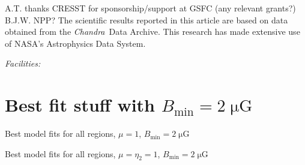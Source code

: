 \documentclass[iop, apj, numberedappendix]{emulateapj}
\newcommand*{\mt}{\mathrm}
\newcommand*{\unit}[1]{\;\mt{#1}}  %
\newcommand*{\Chandra}{\textit{Chandra}\ }
\newcommand*{\mE}{m_\mt{E}}
\newcommand*{\Bmin}{B_{\mt{min}}}
\newcommand*{\muG}{\unit{\mu G}}
\begin{document}
\acknowledgments

A.T. thanks CRESST for sponsorship/support at GSFC (any relevant grants?)
B.J.W. NPP?
The scientific results reported in this article are based on data obtained from
the \Chandra Data Archive.
This research has made extensive use of NASA's Astrophysics Data System.

{\it Facilities:} 

\clearpage
\appendix

\setcounter{table}{0}
\renewcommand{\thetable}{A\arabic{table}}
\setcounter{figure}{0}
\renewcommand{\thefigure}{A\arabic{figure}}

%
%    

\section{Best fit stuff with $\Bmin=2\muG$}

\begin{table}[ht]
    \scriptsize
    \centering
    \caption{Best model fits for all regions, $\mu = 1$, $\Bmin=2\muG$}
    
\end{table}

\begin{table}[ht]
    \scriptsize
    \centering
    \caption{Best model fits for all regions, $\mu = \eta_2 = 1$,
        $\Bmin=2\muG$}
    
\end{table}
\end{document}
